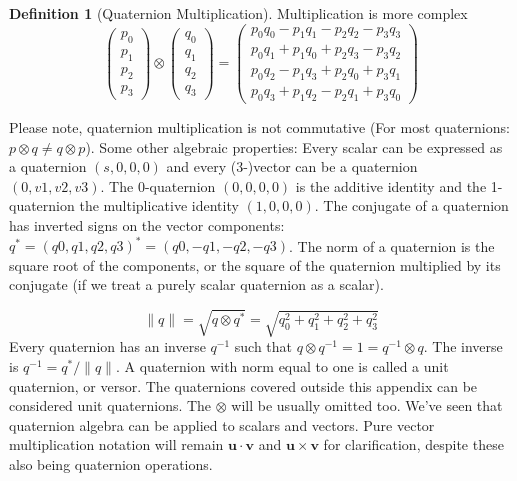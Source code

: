 \documentclass{amsart}
\theoremstyle{definition}
\newtheorem{definition}[theorem]{Definition}
\theoremstyle{remark}
\numberwithin{equation}{section}
\begin{document}
\begin{definition}[Quaternion Multiplication]
Multiplication is more complex
\begin{equation}
 \begin{pmatrix}
    p_0 \\
    p_1 \\
    p_2 \\
    p_3
  \end{pmatrix} \otimes 
  \begin{pmatrix}
    q_0 \\
    q_1 \\
    q_2 \\
    q_3
  \end{pmatrix} =
  \begin{pmatrix}
    p_0q_0 - p_1q_1 - p_2q_2 - p_3q_3 \\
    p_0q_1 + p_1q_0 + p_2q_3 - p_3q_2 \\
    p_0q_2 - p_1q_3 + p_2q_0 + p_3q_1 \\
    p_0q_3 + p_1q_2 - p_2q_1 + p_3q_0
  \end{pmatrix}
\end{equation}
\end{definition}
Please note, quaternion multiplication is not commutative (For most quaternions: $p\otimes q\neq q \otimes p$). Some other algebraic properties:
Every scalar can be expressed as a quaternion $(s, 0, 0, 0)$ and every (3-)vector can be a quaternion $(0, v1, v2, v3)$. The 0-quaternion $(0, 0, 0, 0)$ is the additive identity and the 1-quaternion the multiplicative identity $(1, 0, 0, 0)$. The conjugate of a quaternion has inverted signs on the vector components: $q^*=(q0, q1, q2, q3)^*=(q0, -q1, -q2, -q3)$. The norm of a quaternion is the square root of the components, or the square of the quaternion multiplied by its conjugate (if we treat a purely scalar quaternion as a scalar).

\begin{equation}
  \|q\| = \sqrt{q\otimes q^*} = \sqrt{q_0^2+q_1^2+q_2^2+q_3^2}
\end{equation}
Every quaternion has an inverse $q^{-1}$ such that $q\otimes q^{-1}=1=q^{-1}\otimes q$. The inverse is $q^{-1}=q^*/\|q\|$. A quaternion with norm equal to one is called a unit quaternion, or versor. The quaternions covered outside this appendix can be considered unit quaternions. The $\otimes$ will be usually omitted too. We've seen that quaternion algebra can be applied to scalars and vectors. Pure vector multiplication notation will remain $\mathbf{u}\cdot\mathbf{v}$ and $\mathbf{u}\times\mathbf{v}$ for clarification, despite these also being quaternion operations.
\end{document}
